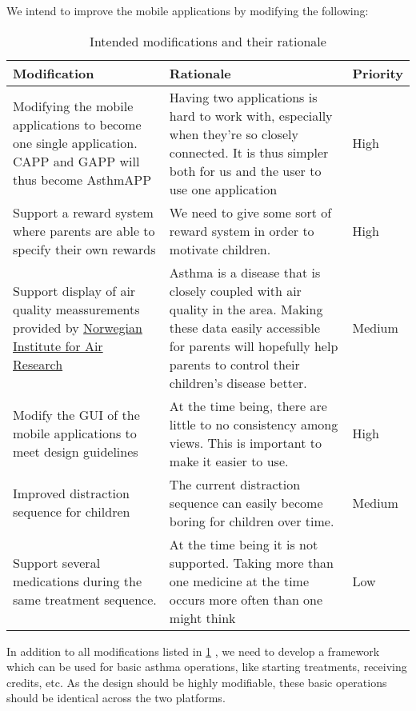 We intend to improve the mobile applications by modifying the following:
\begin{table}

\begin{tabular}{| p{5.0cm} | p{5.0cm} | p{3.0cm} |}
	\hline
	\textbf{Modification} & \textbf{Rationale} & \textbf{Priority} \\
	\hline
	Modifying the mobile applications to become one single application. CAPP and GAPP will thus become AsthmAPP 
	&
	Having two applications is hard to work with, especially when they're so closely connected. It is thus simpler both for us and the user to use one application
	&
	High
	\\ \hline
	Support a reward system where parents are able to specify their own rewards
	&
	We need to give some sort of reward system in order to motivate children.
	&
	High 
	\\ \hline
	Support display of air quality meassurements provided by \href{http://luftkvalitet.info}{Norwegian Institute for Air Research}
	&
	Asthma is a disease that is closely coupled with air quality in the area. Making these data easily accessible for parents will hopefully help parents to control their children's disease better.
	&
	Medium  
	\\ \hline
	Modify the GUI of the mobile applications to meet design guidelines
	&
	At the time being, there are little to no consistency among views. This is important to make it easier to use.
	&
	High 
	\\ \hline
	Improved distraction sequence for children
	& 
	The current distraction sequence can easily become boring for children over time.
	&
	Medium
	\\ \hline
	Support several medications during the same treatment sequence.
	&
	At the time being it is not supported. Taking more than one medicine at the time occurs more often than one might think
	&
	Low 
	\\ \hline
\end{tabular}
\caption{Intended modifications and their rationale}
\label{tab:intended-modifications}
\end{table}

In addition to all modifications listed in \ref{tab:intended-modifications} , we need to develop a framework which can be used for basic asthma operations, like starting treatments, receiving credits, etc. As the design should be highly modifiable, these basic operations should be identical across the two platforms.    
 